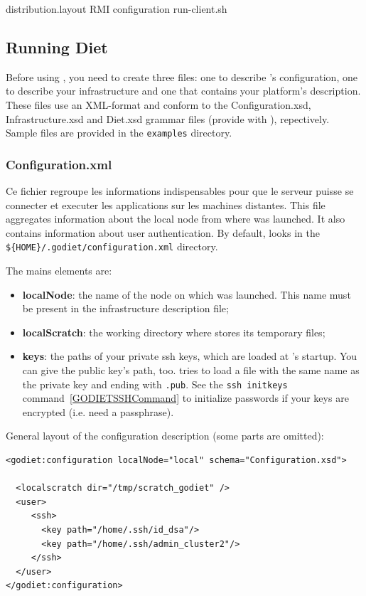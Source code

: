 distribution.layout
RMI configuration
run-client.sh


\subsection{\bla Running Diet}

Before using \godiet, you need to create three files: one to describe \godiet's configuration, one to describe your infrastructure and one that contains your \diet platform's description.
These files use an XML-format and conform to the Configuration.xsd, Infrastructure.xsd and Diet.xsd grammar files (provide with \godiet), repectively.
Sample files are provided in the \verb+examples+ directory. 

\subsubsection{Configuration.xml}
\label{GODIETConfiguration}

\bla Ce fichier regroupe les informations indispensables pour que le serveur puisse se connecter et executer les applications sur les machines distantes.
This file aggregates information about the local node from where \godiet was launched. It also contains information about user authentication.
By default, \godiet looks in the \verb+${HOME}/.godiet/configuration.xml+ directory.

\vspace{1cm}
The mains elements are:
\begin{itemize}
\item \textbf{localNode}: the name of the node on which \godiet was launched. This name must be present in the infrastructure description file;
\item \textbf{localScratch}: the working directory where \godiet stores its temporary files;
\item \textbf{keys}: the paths of your private ssh keys, which are loaded at \godiet's startup. You can give the public key's path, too. \godiet tries to load a file with the same name as the private key and ending with \verb+.pub+. See the \verb+ssh initkeys+ command~\ref{GODIETSSHCommand} to initialize passwords if your keys are encrypted (i.e. need a passphrase).
\end{itemize}

\vspace{1cm}
General layout of the configuration description (some parts are omitted):
\begin{verbatim}
<godiet:configuration localNode="local" schema="Configuration.xsd">

  <localscratch dir="/tmp/scratch_godiet" />
  <user>
     <ssh>
       <key path="/home/.ssh/id_dsa"/>
       <key path="/home/.ssh/admin_cluster2"/>
     </ssh>
  </user>
</godiet:configuration>
\end{verbatim}

